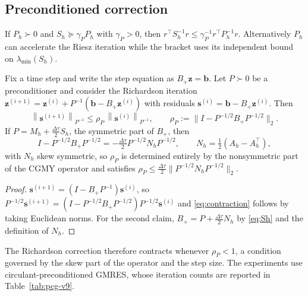 \documentclass[supplement,hidelinks]{siamart251216}
\newcommand{\Mh}{M_h}
\newcommand{\Ah}{A_h}
\newcommand{\Sh}{S_h}
\newcommand{\norm}[1]{\left\lVert #1\right\rVert}
\newcommand{\dt}{\Delta\tau}
\newcommand{\bb}{\mathbf b}
\newcommand{\zz}{\mathbf z}
\newcommand{\sres}{\mathbf s}
\begin{document}
\subsection{Preconditioned correction}
\label{ssec:correction-extension}
If $P_h\succ0$ and $\Sh\succeq\gamma_P P_h$ with $\gamma_P>0$, then
$r^\top\Sh^{-1}r\le\gamma_P^{-1}r^\top P_h^{-1}r$.
Alternatively $P_h$ can accelerate the Riesz iteration while the bracket
uses its independent bound on $\lambda_{\min}(\Sh)$.
\begin{proposition}
\label{prop:correction-contraction}
Fix a time step and write the step equation as $B_+\zz=\bb$.  Let $P\succ0$ be
a preconditioner and consider the Richardson iteration
$\zz^{(i+1)}=\zz^{(i)}+P^{-1}(\bb-B_+\zz^{(i)})$ with residuals
$\sres^{(i)}=\bb-B_+\zz^{(i)}$.  Then
\begin{equation}
  \norm{\sres^{(i+1)}}_{P^{-1}}\le\rho_P\,\norm{\sres^{(i)}}_{P^{-1}},
  \qquad
  \rho_P:=\bigl\lVert I-P^{-1/2}B_+P^{-1/2}\bigr\rVert_2 .
  \label{eq:contraction}
\end{equation}
If $P=\Mh+\tfrac{\dt}{2}\Sh$, the symmetric part of $B_+$, then
\[
I-P^{-1/2}B_+P^{-1/2}=-\tfrac{\dt}{2}P^{-1/2}N_hP^{-1/2},\qquad N_h=\tfrac12(\Ah-\Ah^\top),
\]
with $N_h$ skew symmetric, so $\rho_P$ is determined entirely by the nonsymmetric part of the
CGMY operator and satisfies $\rho_P\le\tfrac{\dt}{2}\lVert P^{-1/2}N_hP^{-1/2}\rVert_2$.
\end{proposition}

\begin{proof}
$\sres^{(i+1)}=(I-B_+P^{-1})\sres^{(i)}$, so
$P^{-1/2}\sres^{(i+1)}=(I-P^{-1/2}B_+P^{-1/2})P^{-1/2}\sres^{(i)}$ and
\eqref{eq:contraction} follows by taking Euclidean norms.  For the second
claim, $B_+=P+\tfrac{\dt}{2}N_h$ by \eqref{eq:Sh} and the definition of $N_h$.
\end{proof}
The Richardson correction therefore contracts whenever $\rho_P<1$, a condition
governed by the skew part of the operator and the step size.  The experiments use
circulant-preconditioned GMRES, whose iteration counts are reported in Table~\ref{tab:pcg-v9}.

\end{document}
